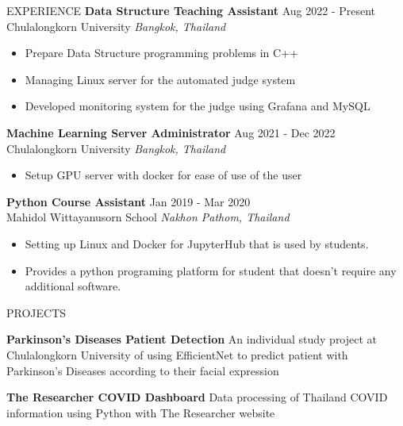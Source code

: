 \documentclass{resume} %
\begin{document}
\begin{rSection}{EXPERIENCE}
    \textbf{Data Structure Teaching Assistant} \hfill Aug 2022 - Present\\
    Chulalongkorn University \hfill \textit{Bangkok, Thailand}
    \begin{itemize}
        \itemsep -3pt {}
        \item Prepare Data Structure programming problems in C++
        \item Managing Linux server for the automated judge system
        \item Developed monitoring system for the judge using Grafana and MySQL
    \end{itemize}
    \textbf{Machine Learning Server Administrator} \hfill Aug 2021 - Dec 2022\\
    Chulalongkorn University \hfill \textit{Bangkok, Thailand}
    \begin{itemize}
        \itemsep -3pt {}
        \item Setup GPU server with docker for ease of use of the user
    \end{itemize}
    \textbf{Python Course Assistant} \hfill Jan 2019 - Mar 2020\\
    Mahidol Wittayanusorn School \hfill \textit{Nakhon Pathom, Thailand}
    \begin{itemize}
        \itemsep -3pt {}
        \item Setting up Linux and Docker for JupyterHub that is used by students.
        \item Provides a python programing platform for student that doesn't require any additional software.
    \end{itemize}

\end{rSection}


\begin{rSection}{PROJECTS}
    \vspace{-1.25em}
    \item \textbf{Parkinson's Diseases Patient Detection} {An individual study project at Chulalongkorn University of using EfficientNet to predict patient with Parkinson's Diseases according to their facial expression}
    \item \textbf{The Researcher COVID Dashboard} {Data processing of Thailand COVID information using Python with The Researcher website}
\end{rSection}
\end{document}
